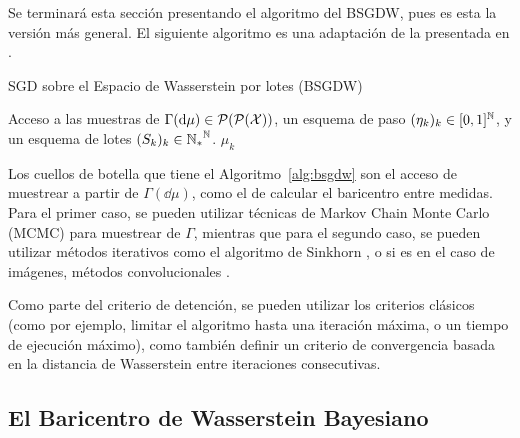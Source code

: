 Se terminará esta sección presentando el algoritmo del BSGDW, pues es esta la versión más general. El siguiente algoritmo es una adaptación de la presentada en \cite{backhoff2022bayesian}.
\begin{algorithm}[htbp]
	\caption{SGD sobre el Espacio de Wasserstein por lotes (BSGDW) \cite{backhoff2022bayesian}}
	\label{alg:bsgdw}
	\begin{algorithmic}[1]
		\Require Acceso a las muestras de $\Gamma(\dd \mu) \in \ProbSpace[\ProbSpace]$, un esquema de paso $(\eta_k)_k \in [0, 1]^\N$, y un esquema de lotes $(S_k)_k \in {\N_\ast}^\N$.
		\Repeat
		 
		\State\Return $\mu_k$
	\end{algorithmic}
\end{algorithm}

Los cuellos de botella que tiene el Algoritmo~\ref{alg:bsgdw} son el acceso de muestrear a partir de $\Gamma(\dd \mu)$, como el de calcular el baricentro entre medidas. Para el primer caso, se pueden utilizar técnicas de Markov Chain Monte Carlo (MCMC) \cite{andrieu2003introduction,brooks2011handbook,goodman2010ensemble} para muestrear de $\Gamma$, mientras que para el segundo caso, se pueden utilizar métodos iterativos como el algoritmo de Sinkhorn \cite{cuturi2013sinkhorn}, o si es en el caso de imágenes, métodos convolucionales \cite{solomon2015convolutional,janati2020debiased}.

Como parte del criterio de detención, se pueden utilizar los criterios clásicos (como por ejemplo, limitar el algoritmo hasta una iteración máxima, o un tiempo de ejecución máximo), como también definir un criterio de convergencia basada en la distancia de Wasserstein entre iteraciones consecutivas.



\subsection{El Baricentro de Wasserstein Bayesiano}\label{ssec:baricentro-Wasserstein-Bayesiano}  %

